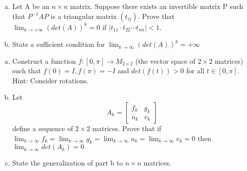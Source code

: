 \documentclass[12pt,letterpaper,cm]{hmcpset}
\begin{document}
\pagebreak

\begin{problem}[B4]
    \begin{enumerate}[a)]
        \item Let A be an $n\times n$ matrix. Suppose there exists an invertible matrix P such that $P^{-1}AP$ is a triangular matrix $(t_{ij})$. Prove that $\lim_{k\rightarrow+\infty}(det(A))^k = 0$ if $|t_{11}\cdot t_{22}\cdots t_{nn}|<1$.
        \item State a sufficient condition for $\lim_{k\rightarrow\infty}(det(A))^k = +\infty$
    \end{enumerate}
\end{problem}
\begin{solution}
    
\end{solution}
\pagebreak

\begin{problem}[B5]
    \begin{enumerate}[a)]
        \item Construct a function $f:[0,\pi]\rightarrow M_{2\times2}$ (the vector space of $2\times2$ matrices) such that $f(0)=I,f(\pi)=-I$ and $det(f(t))>0$ for all $t\in[0,\pi]$. Hint: Consider rotations.
        \item Let 
        $$
        A_k=\begin{bmatrix}
        f_k & g_k \\
        u_k & v_k
        \end{bmatrix}
        $$
        define a sequence of $2\times 2$ matrices. Prove that if $\lim_{k\rightarrow\infty}f_k=\lim_{k\rightarrow\infty}g_k=\lim_{k\rightarrow\infty}u_k=\lim_{k\rightarrow\infty}v_k=0$ then $\lim_{k\rightarrow\infty}det(A_k)=0$
        \item State the generalization of part b to $n\times n$ matrices.
    \end{enumerate}
\end{problem}
\begin{solution}
    
\end{solution}
\end{document}
